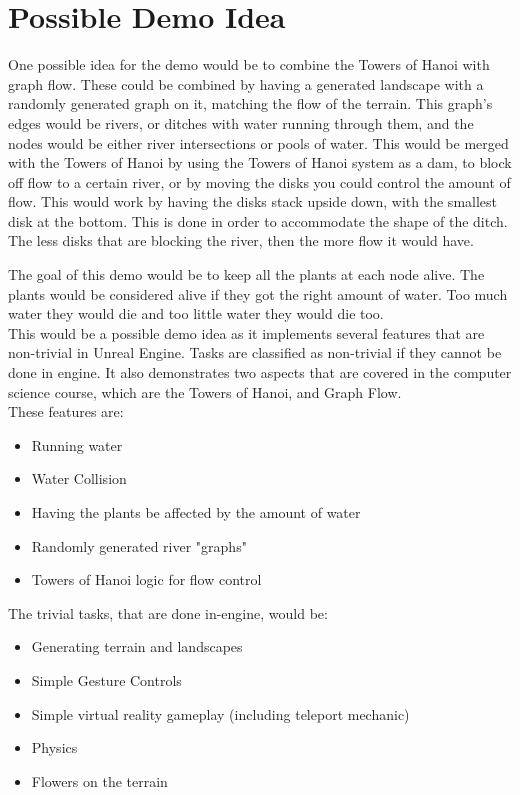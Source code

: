 \section{Possible Demo Idea}
One possible idea for the demo would be to combine the Towers of Hanoi with graph flow. These could be combined by having a generated landscape with a randomly generated graph on it, matching the flow of the terrain. This graph's edges would be rivers, or ditches with water running through them, and the nodes would be either river intersections or pools of water. This would be merged with the Towers of Hanoi by using the Towers of Hanoi system as a dam, to block off flow to a certain river, or by moving the disks you could control the amount of flow. This would work by having the disks stack upside down, with the smallest disk at the bottom. This is done in order to accommodate the shape of the ditch. The less disks that are blocking the river, then the more flow it would have.
\newline
\par
The goal of this demo would be to keep all the plants at each node alive. The plants would be considered alive if they got the right amount of water. Too much water they would die and too little water they would die too. \\
This would be a possible demo idea as it implements several features that are non-trivial in Unreal Engine. Tasks are classified as non-trivial if they cannot be done in engine. It also demonstrates two aspects that are covered in the computer science course, which are the Towers of Hanoi, and Graph Flow.\\ 
These features are: \\
\begin{itemize}
	\item Running water
	\item Water Collision
	\item Having the plants be affected by the amount of water
	\item Randomly generated river "graphs"
	\item Towers of Hanoi logic for flow control
\end{itemize}
The trivial tasks, that are done in-engine, would be:
\begin{itemize}
	\item Generating terrain and landscapes
	\item Simple Gesture Controls
	\item Simple virtual reality gameplay (including teleport mechanic)
	\item Physics
	\item Flowers on the terrain
\end{itemize}

